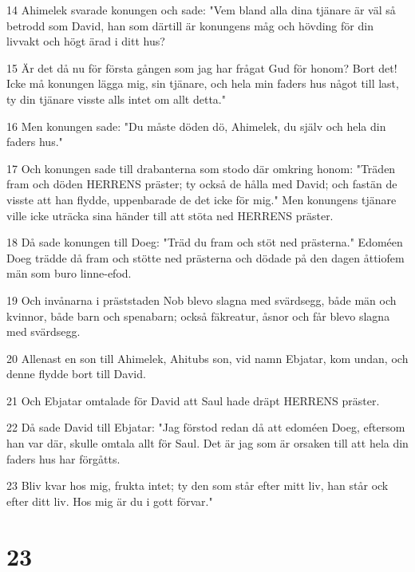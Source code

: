 \par 14 Ahimelek svarade konungen och sade: "Vem bland alla dina tjänare är väl så betrodd som David, han som därtill är konungens måg och hövding för din livvakt och högt ärad i ditt hus?
\par 15 Är det då nu för första gången som jag har frågat Gud för honom? Bort det! Icke må konungen lägga mig, sin tjänare, och hela min faders hus något till last, ty din tjänare visste alls intet om allt detta."
\par 16 Men konungen sade: "Du måste döden dö, Ahimelek, du själv och hela din faders hus."
\par 17 Och konungen sade till drabanterna som stodo där omkring honom: "Träden fram och döden HERRENS präster; ty också de hålla med David; och fastän de visste att han flydde, uppenbarade de det icke för mig." Men konungens tjänare ville icke uträcka sina händer till att stöta ned HERRENS präster.
\par 18 Då sade konungen till Doeg: "Träd du fram och stöt ned prästerna." Edoméen Doeg trädde då fram och stötte ned prästerna och dödade på den dagen åttiofem män som buro linne-efod.
\par 19 Och invånarna i präststaden Nob blevo slagna med svärdsegg, både män och kvinnor, både barn och spenabarn; också fäkreatur, åsnor och får blevo slagna med svärdsegg.
\par 20 Allenast en son till Ahimelek, Ahitubs son, vid namn Ebjatar, kom undan, och denne flydde bort till David.
\par 21 Och Ebjatar omtalade för David att Saul hade dräpt HERRENS präster.
\par 22 Då sade David till Ebjatar: "Jag förstod redan då att edoméen Doeg, eftersom han var där, skulle omtala allt för Saul. Det är jag som är orsaken till att hela din faders hus har förgåtts.
\par 23 Bliv kvar hos mig, frukta intet; ty den som står efter mitt liv, han står ock efter ditt liv. Hos mig är du i gott förvar."

\chapter{23}

